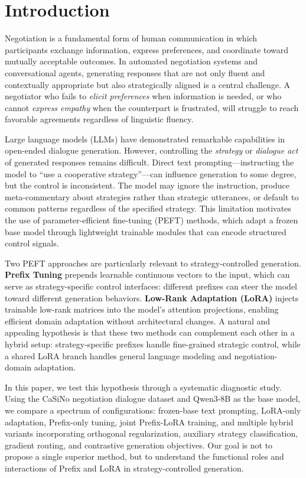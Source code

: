 \documentclass[conference]{IEEEtran}
\begin{document}
\section{Introduction}

Negotiation is a fundamental form of human communication in which participants exchange information, express preferences, and coordinate toward mutually acceptable outcomes. In automated negotiation systems and conversational agents, generating responses that are not only fluent and contextually appropriate but also strategically aligned is a central challenge. A negotiator who fails to \textit{elicit preferences} when information is needed, or who cannot \textit{express empathy} when the counterpart is frustrated, will struggle to reach favorable agreements regardless of linguistic fluency.

Large language models (LLMs) have demonstrated remarkable capabilities in open-ended dialogue generation. However, controlling the \textit{strategy} or \textit{dialogue act} of generated responses remains difficult. Direct text prompting---instructing the model to ``use a cooperative strategy''---can influence generation to some degree, but the control is inconsistent. The model may ignore the instruction, produce meta-commentary about strategies rather than strategic utterances, or default to common patterns regardless of the specified strategy. This limitation motivates the use of parameter-efficient fine-tuning (PEFT) methods, which adapt a frozen base model through lightweight trainable modules that can encode structured control signals.

Two PEFT approaches are particularly relevant to strategy-controlled generation. \textbf{Prefix Tuning} prepends learnable continuous vectors to the input, which can serve as strategy-specific control interfaces: different prefixes can steer the model toward different generation behaviors. \textbf{Low-Rank Adaptation (LoRA)} injects trainable low-rank matrices into the model's attention projections, enabling efficient domain adaptation without architectural changes. A natural and appealing hypothesis is that these two methods can complement each other in a hybrid setup: strategy-specific prefixes handle fine-grained strategic control, while a shared LoRA branch handles general language modeling and negotiation-domain adaptation.

In this paper, we test this hypothesis through a systematic diagnostic study. Using the CaSiNo negotiation dialogue dataset and Qwen3-8B as the base model, we compare a spectrum of configurations: frozen-base text prompting, LoRA-only adaptation, Prefix-only tuning, joint Prefix-LoRA training, and multiple hybrid variants incorporating orthogonal regularization, auxiliary strategy classification, gradient routing, and contrastive generation objectives. Our goal is not to propose a single superior method, but to understand the functional roles and interactions of Prefix and LoRA in strategy-controlled generation.
\end{document}
